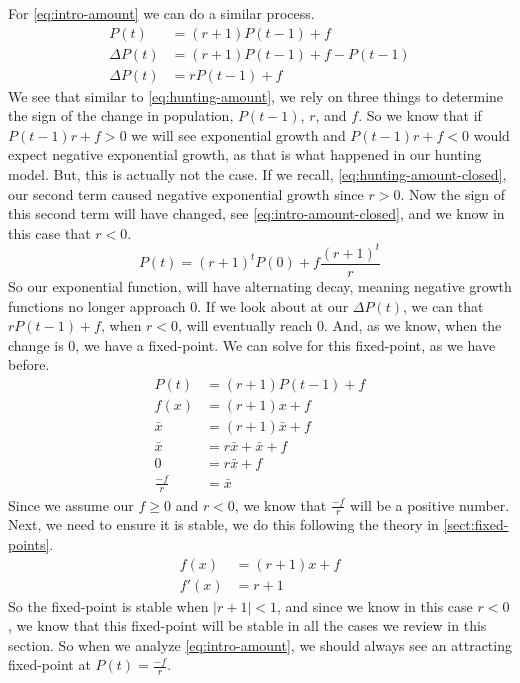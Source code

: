 \documentclass{article}
\begin{document}
For \cref{eq:intro-amount} we can do a similar process.
\begin{align*}
    P(t) &= (r+1)P(t-1) + f \\
    \Delta P(t) &= (r+1)P(t-1) + f - P(t-1)\\
    \Delta P(t) &= rP(t-1) + f
\end{align*}
We see that similar to \cref{eq:hunting-amount}, we rely on three things to determine the sign of the change in population, $P(t-1)$, $r$, and $f$. So we know that if $P(t-1)r + f > 0$ we will see exponential growth and $P(t-1)r + f < 0$ would expect negative exponential growth, as that is what happened in our hunting model. But, this is actually not the case. If we recall, \cref{eq:hunting-amount-closed}, our second term caused negative exponential growth since $r > 0$. Now the sign of this second term will have changed, see \cref{eq:intro-amount-closed}, and we know in this case that $r < 0$.
\begin{equation}\label{eq:intro-amount-closed}
    P(t) = (r+1)^tP(0)+f\frac{(r+1)^t}{r}
\end{equation}
So our exponential function, will have alternating decay, meaning negative growth functions no longer approach 0. If we look about at our $\Delta P(t)$, we can that $rP(t-1) + f$, when $r < 0$, will eventually reach 0. And, as we know, when the change is 0, we have a fixed-point. We can solve for this fixed-point, as we have before.
\begin{align*}
    P(t) &= (r+1)P(t-1) + f \\
    f(x) &= (r+1)x + f \\
    \bar{x} &= (r+1)\bar{x} + f\\
    \bar{x} &= r\bar{x} + \bar{x} + f\\
    0 &= r\bar{x} + f\\
    \frac{-f}{r} &= \bar{x}
\end{align*}
Since we assume our $f \ge 0$ and $r < 0$, we know that $\frac{-f}{r}$ will be a positive number. Next, we need to ensure it is stable, we do this following the theory in \cref{sect:fixed-points}.
\begin{align*}
    f(x) &= (r+1)x + f \\
    f'(x) &= r + 1
\end{align*}
So the fixed-point is stable when $|r + 1| < 1$, and since we know in this case $r < 0$, we know that this fixed-point will be stable in all the cases we review in this section. So when we analyze \cref{eq:intro-amount}, we should always see an attracting fixed-point at $P(t) = \frac{-f}{r}$.
\newpage
\end{document}
